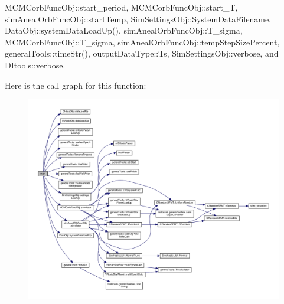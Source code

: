 M\-C\-M\-Corb\-Func\-Obj\-::start\-\_\-period, M\-C\-M\-Corb\-Func\-Obj\-::start\-\_\-\-T, sim\-Aneal\-Orb\-Func\-Obj\-::start\-Temp, Sim\-Settings\-Obj\-::\-System\-Data\-Filename, Data\-Obj\-::system\-Data\-Load\-Up(), sim\-Aneal\-Orb\-Func\-Obj\-::\-T\-\_\-sigma, M\-C\-M\-Corb\-Func\-Obj\-::\-T\-\_\-sigma, sim\-Aneal\-Orb\-Func\-Obj\-::temp\-Step\-Size\-Percent, general\-Tools\-::time\-Str(), output\-Data\-Type\-::\-Ts, Sim\-Settings\-Obj\-::verbose, and D\-Itools\-::verbose.



Here is the call graph for this function\-:\nopagebreak
\begin{figure}[H]
\begin{center}
\leavevmode
\includegraphics[width=350pt]{looped___m_c_m_corb_simulator_8cpp_a0ddf1224851353fc92bfbff6f499fa97_cgraph}
\end{center}
\end{figure}


